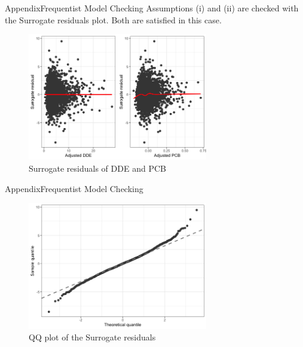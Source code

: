 \documentclass{beamer}
\begin{document}
\begin{frame}{Appendix}{Frequentist Model Checking}
Assumptions (i) and (ii) are checked with the Surrogate residuals plot. Both are satisfied in this case.
\begin{figure}
\centering
\includegraphics[width=0.7\textwidth]{Surrogate_residuals.png}
\caption{Surrogate residuals of DDE and PCB}
\label{fig:surrogateresid}
\end{figure}
\end{frame}
\begin{frame}{Appendix}{Frequentist Model Checking}
\begin{figure}
\centering
\includegraphics[width=0.7\textwidth]{qqplot.png}
\caption{QQ plot of the Surrogate residuals}
\label{fig:qqplot}
\end{figure}
\end{frame}
\end{document}
